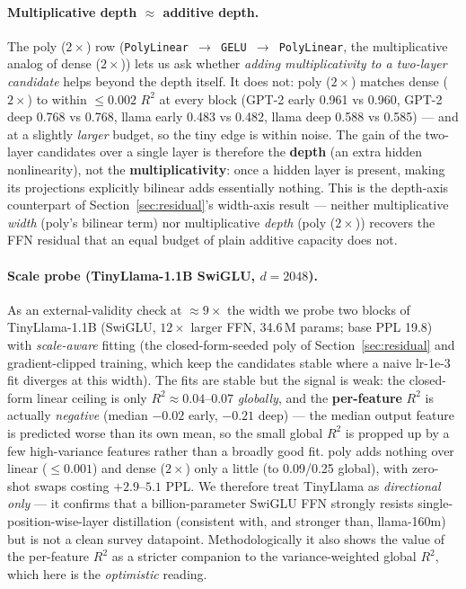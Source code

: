 \documentclass{article}
\begin{document}
\paragraph{Multiplicative depth $\approx$ additive depth.} The poly ($2\times$) row
(\texttt{PolyLinear $\to$ GELU $\to$ PolyLinear}, the multiplicative analog of dense ($2\times$))
lets us ask whether \emph{adding multiplicativity to a two-layer candidate} helps beyond the
depth itself. It does not: poly ($2\times$) matches dense ($2\times$) to within $\le 0.002$ $R^2$
at every block (GPT-2 early 0.961 vs 0.960, GPT-2 deep 0.768 vs 0.768, llama early 0.483 vs 0.482,
llama deep 0.588 vs 0.585) --- and at a slightly \emph{larger} budget, so the tiny edge is within
noise. The gain of the two-layer candidates over a single layer is therefore the \textbf{depth}
(an extra hidden nonlinearity), not the \textbf{multiplicativity}: once a hidden layer is present,
making its projections explicitly bilinear adds essentially nothing. This is the depth-axis
counterpart of Section~\ref{sec:residual}'s width-axis result --- neither multiplicative
\emph{width} (poly's bilinear term) nor multiplicative \emph{depth} (poly ($2\times$)) recovers
the FFN residual that an equal budget of plain additive capacity does not.

\paragraph{Scale probe (TinyLlama-1.1B SwiGLU, $d = 2048$).} As an external-validity check at
${\approx}9\times$ the width we probe two blocks of TinyLlama-1.1B (SwiGLU, $12\times$ larger
FFN, 34.6\,M params; base PPL 19.8) with \emph{scale-aware} fitting (the closed-form-seeded poly
of Section~\ref{sec:residual} and gradient-clipped training, which keep the candidates stable
where a naive lr-1e-3 fit diverges at this width). The fits are stable but the signal is weak: the
closed-form linear ceiling is only $R^2 \approx 0.04$--$0.07$ \emph{globally}, and the
\textbf{per-feature} $R^2$ is actually \emph{negative} (median $-0.02$ early, $-0.21$ deep) --- the
median output feature is predicted worse than its own mean, so the small global $R^2$ is propped
up by a few high-variance features rather than a broadly good fit. poly adds nothing over linear
($\le 0.001$) and dense ($2\times$) only a little (to 0.09/0.25 global), with zero-shot swaps
costing $+2.9$--$5.1$ PPL. We therefore treat TinyLlama as \emph{directional only} --- it confirms
that a billion-parameter SwiGLU FFN strongly resists single-position-wise-layer distillation
(consistent with, and stronger than, llama-160m) but is not a clean survey datapoint.
Methodologically it also shows the value of the per-feature $R^2$ as a stricter companion to the
variance-weighted global $R^2$, which here is the \emph{optimistic} reading.
\end{document}
